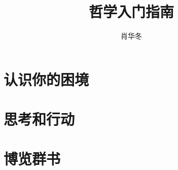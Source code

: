 \documentclass[twoside,nofonts,fancyhdr,openany,UTF8]{ctexbook}
\title{\Huge\textbf{哲学入门指南}}
\author{肖华冬}
\begin{document}
\frontmatter

\maketitle
\cleardoublepage

\tableofcontents
\newpage


\mainmatter
\chapter {认识你的困境}
\chapter {思考和行动}
\chapter {博览群书}

\appendix
\backmatter
\printindex
\end{document}
